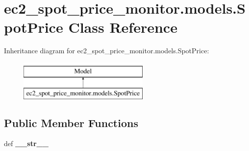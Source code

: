 \hypertarget{classec2__spot__price__monitor_1_1models_1_1SpotPrice}{\section{ec2\-\_\-spot\-\_\-price\-\_\-monitor.\-models.\-Spot\-Price Class Reference}
\label{classec2__spot__price__monitor_1_1models_1_1SpotPrice}
}
Inheritance diagram for ec2\-\_\-spot\-\_\-price\-\_\-monitor.\-models.\-Spot\-Price\-:\begin{figure}[H]
\begin{center}
\leavevmode
\includegraphics[height=2.000000cm]{classec2__spot__price__monitor_1_1models_1_1SpotPrice}
\end{center}
\end{figure}
\subsection*{Public Member Functions}
\begin{DoxyCompactItemize}
\item 
\hypertarget{classec2__spot__price__monitor_1_1models_1_1SpotPrice_af3788df5b72c452f932385aa559ecb33}{def {\bfseries \-\_\-\-\_\-str\-\_\-\-\_\-}}\label{classec2__spot__price__monitor_1_1models_1_1SpotPrice_af3788df5b72c452f932385aa559ecb33}

\end{DoxyCompactItemize}
